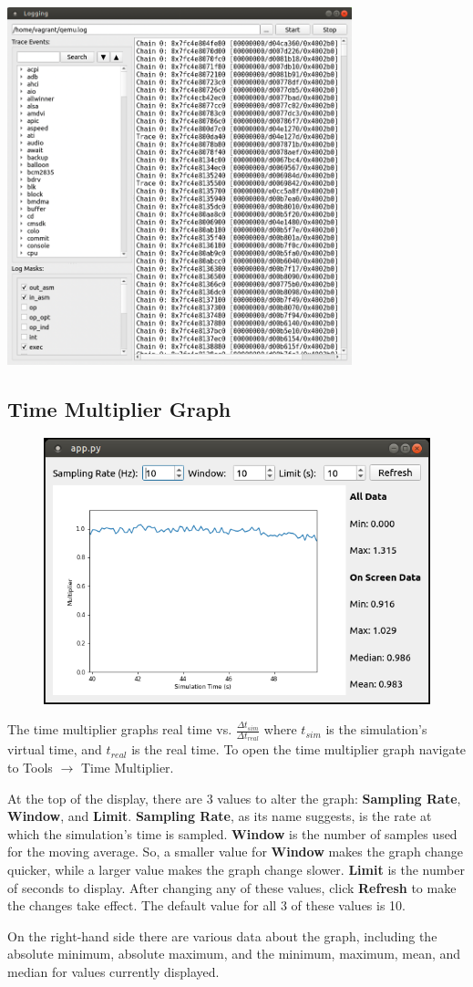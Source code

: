 \documentclass{article}
\begin{document}
\begin{center}
    \includegraphics[width=100mm]{images/logging-view-populated.png}
\end{center}
\subsection{Time Multiplier Graph}
\begin{figure}[h]
    \centering
    \includegraphics[width=.6\textwidth]{images/TimeMult.PNG}
    \label{fig:timemult}
\end{figure}
The time multiplier graphs real time vs. $\frac{\Delta t_{sim}}{\Delta t_{real}}$ where $t_{sim}$ is the simulation's virtual time, and $t_{real}$ is the real time. To open the time multiplier graph navigate to Tools $\rightarrow$ Time Multiplier.\par
At the top of the display, there are 3 values to alter the graph: \textbf{Sampling Rate}, \textbf{Window}, and \textbf{Limit}. \textbf{Sampling Rate}, as its name suggests, is the rate at which the simulation's time is sampled. \textbf{Window} is the number of samples used for the moving average. So, a smaller value for \textbf{Window} makes the graph change quicker, while a larger value makes the graph change slower. \textbf{Limit} is the number of seconds to display. After changing any of these values, click \textbf{Refresh} to make the changes take effect. The default value for all 3 of these values is 10.\par
On the right-hand side there are various data about the graph, including the absolute minimum, absolute maximum, and the minimum, maximum, mean, and median for values currently displayed.
\end{document}
